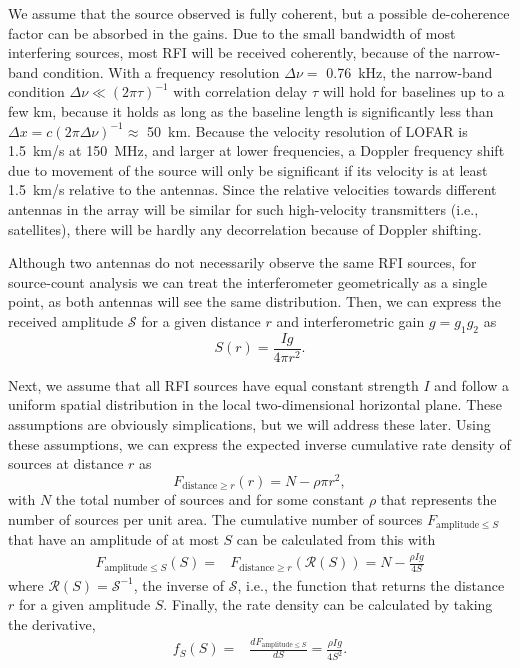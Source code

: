 \documentclass[useAMS,usenatbib]{mn2e}
\begin{document}
We assume that the source observed is fully coherent, but a possible de-coherence factor can be absorbed in the gains. Due to the small bandwidth of most interfering sources, most RFI will be received coherently, because of the narrow-band condition. With a frequency resolution $\Delta\nu=$ 0.76~kHz, the narrow-band condition $\Delta \nu \ll (2\pi \tau)^{-1}$ with correlation delay $\tau$ will hold for baselines up to a few km, because it holds as long as the baseline length is significantly less than $\Delta x = c (2 \pi \Delta \nu)^{-1} \approx$ 50~km. Because the velocity resolution of LOFAR is 1.5~km/s at 150~MHz, and larger at lower frequencies, a Doppler frequency shift due to movement of the source will only be significant if its velocity is at least 1.5~km/s relative to the antennas. Since the relative velocities towards different antennas in the array will be similar for such high-velocity transmitters (i.e., satellites), there will be hardly any decorrelation because of Doppler shifting.

Although two antennas do not necessarily observe the same RFI sources, for source-count analysis we can treat the interferometer geometrically as a single point, as both antennas will see the same distribution. Then, we can express the received amplitude $\mathcal{S}$ for a given distance $r$ and interferometric gain $g = g_1 g_2$ as
\begin{equation} \label{eq:amplitude-fall-off-in-free-space}
 S(r) = \frac{Ig}{4\pi r^2}.
\end{equation}

Next, we assume that all RFI sources have equal constant strength $I$ and follow a uniform spatial distribution in the local two-dimensional horizontal plane. These assumptions are obviously simplications, but we will address these later. Using these assumptions, we can express the expected inverse cumulative rate density of sources at distance $r$ as
\begin{equation} \label{eq:inverse-cumulative-distance-function}
F_{\textrm{distance} \ge r}(r) = N - \rho \pi r^2,
\end{equation}
with $N$ the total number of sources and for some constant $\rho$ that represents the number of sources per unit area. The cumulative number of sources $F_{\textrm{amplitude} \le S}$ that have an amplitude of at most $S$ can be calculated from this with
\begin{align} \label{eq:cumulative-rfi-distribution}
 F_{\textrm{amplitude} \le S}(S) = & F_{\textrm{distance} \ge r}(\mathcal{R}(S))
 = N-\frac{\rho Ig}{4S}
\end{align}
where $\mathcal{R}(S)=\mathcal{S}^{-1}$, the inverse of $\mathcal{S}$, i.e., the function that returns the distance $r$ for a given amplitude $S$. Finally, the rate density can be calculated by taking the derivative,
\begin{align} \label{eq:two-dimensional-distribution}
 f_S(S) = & \frac{dF_{\textrm{amplitude} \le S}}{dS} = \frac{\rho Ig}{4S^2}.
\end{align}
\end{document}
